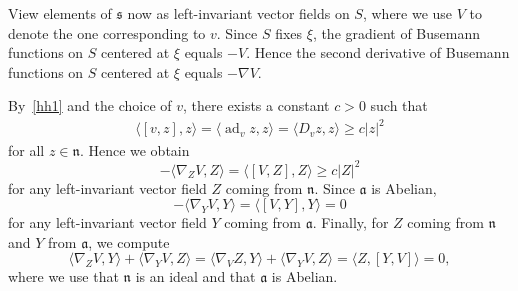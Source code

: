 \documentclass[pdftex]{sigma}
\numberwithin{equation}{section}
\DeclareMathOperator{\ad}{ad}
\begin{document}
View elements of $\mathfrak s$ now as left-invariant vector fields on $S$,
where we use $V$ to denote the one corresponding to $v$.
Since $S$ fixes $\xi$, the gradient of Busemann functions on $S$ centered at $\xi$ equals $-V$.
Hence the second derivative of Busemann functions on $S$ centered at $\xi$ equals $-\nabla V$.

By~\ref{hh1} and the choice of $v$, there exists a constant $c>0$ such that
\begin{align*}
	\langle [v,z],z\rangle = \langle\ad_vz,z\rangle = \langle D_vz,z\rangle \ge c|z|^2
\end{align*}
for all $z\in \mathfrak n$.
Hence we obtain
\[
	-\langle\nabla_ZV,Z\rangle = \langle[V,Z],Z\rangle \ge c|Z|^2
\]
for any left-invariant vector field $Z$ coming from $\mathfrak n$.
Since $\mathfrak a$ is Abelian,
\[
	-\langle\nabla_YV,Y\rangle = \langle[V,Y],Y\rangle = 0
\]
for any left-invariant vector field $Y$ coming from $\mathfrak a$.
Finally, for $Z$ coming from $\mathfrak n$ and $Y$ from $\mathfrak a$, we compute
\[
	\langle \nabla_ZV ,Y \rangle + \langle \nabla_YV ,Z \rangle
= \langle \nabla_VZ ,Y \rangle + \langle \nabla_YV ,Z \rangle = \langle Z , [Y,V] \rangle = 0,
\]
where we use that $\mathfrak n$ is an ideal and that $\mathfrak a$ is Abelian.
\end{document}
